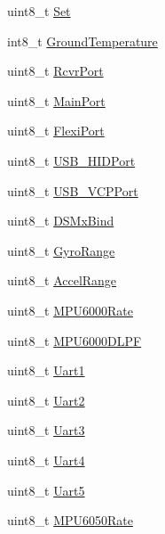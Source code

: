\begin{DoxyCompactItemize}
uint8\-\_\-t \hyperlink{struct____attribute_____a3d43abcbf9f32657212321af944c192f}{\-Set}
\item 
int8\-\_\-t \hyperlink{struct____attribute_____a4a42cf075f9ac9ec1248dbcdb3e2d968}{\-Ground\-Temperature}
\item 
uint8\-\_\-t \hyperlink{struct____attribute_____a2251dc31047cff718bcf19c0f393f16b}{\-Rcvr\-Port}
\item 
uint8\-\_\-t \hyperlink{struct____attribute_____a59b833a26f8fc4dcd1bbdaf849a46b5d}{\-Main\-Port}
\item 
uint8\-\_\-t \hyperlink{struct____attribute_____a812eb6cabc8e5c22ec2828cc0c57b4b3}{\-Flexi\-Port}
\item 
uint8\-\_\-t \hyperlink{struct____attribute_____a9b0a9a5fe67d353c722fbf6354a6fbd6}{\-U\-S\-B\-\_\-\-H\-I\-D\-Port}
\item 
uint8\-\_\-t \hyperlink{struct____attribute_____a2e1a688d4f4b841b7f0a319d7922df49}{\-U\-S\-B\-\_\-\-V\-C\-P\-Port}
\item 
uint8\-\_\-t \hyperlink{struct____attribute_____a7a1c123b0c3f382a751e0ac89b911028}{\-D\-S\-Mx\-Bind}
\item 
uint8\-\_\-t \hyperlink{struct____attribute_____ac0eb1414736a20193d07da3b5357e3e8}{\-Gyro\-Range}
\item 
uint8\-\_\-t \hyperlink{struct____attribute_____a9bcc0097034336773af69991c0e5a753}{\-Accel\-Range}
\item 
uint8\-\_\-t \hyperlink{struct____attribute_____aa84a1694ebf9da07deab91beab0eca1d}{\-M\-P\-U6000\-Rate}
\item 
uint8\-\_\-t \hyperlink{struct____attribute_____ae9e1250d131cb022b03ea53e8bd92915}{\-M\-P\-U6000\-D\-L\-P\-F}
\item 
uint8\-\_\-t \hyperlink{struct____attribute_____ad34e6887c00e18725ad8c765dd0e1025}{\-Uart1}
\item 
uint8\-\_\-t \hyperlink{struct____attribute_____a82a02661a1f10da3c596d977f9af5bfb}{\-Uart2}
\item 
uint8\-\_\-t \hyperlink{struct____attribute_____a4a32b7af72ea5d381abc138b11db2bdc}{\-Uart3}
\item 
uint8\-\_\-t \hyperlink{struct____attribute_____ac1a298892072ead77a18969c0e567c24}{\-Uart4}
\item 
uint8\-\_\-t \hyperlink{struct____attribute_____a50af098d520d3bd7e493d5368612b14f}{\-Uart5}
\item 
uint8\-\_\-t \hyperlink{struct____attribute_____a383b5a221a0e9d60ce8cb68d3854fac0}{\-M\-P\-U6050\-Rate}
\item 

\end{DoxyCompactItemize}
